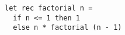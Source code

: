 \begin{lstlisting}[language=caml, label=ocamlex]
let rec factorial n =
  if n <= 1 then 1
  else n * factorial (n - 1)
\end{lstlisting}
